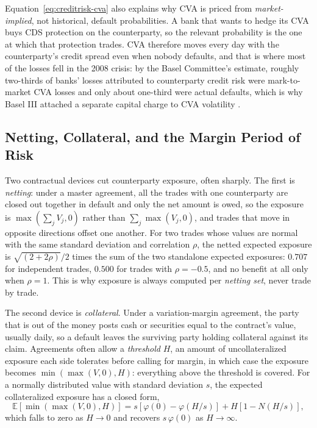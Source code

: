 \documentclass[../ai_in_finance]{subfiles}
\begin{document}
Equation~\eqref{eq:creditrisk-cva} also explains why CVA is priced from \emph{market-implied}, not historical, default probabilities. A bank that wants to hedge its CVA buys CDS protection on the counterparty, so the relevant probability is the one at which that protection trades. CVA therefore moves every day with the counterparty's credit spread even when nobody defaults, and that is where most of the losses fell in the 2008 crisis: by the Basel Committee's estimate, roughly two-thirds of banks' losses attributed to counterparty credit risk were mark-to-market CVA losses and only about one-third were actual defaults, which is why Basel III attached a separate capital charge to CVA volatility \parencite{bcbs2011ccr}.

\subsection{Netting, Collateral, and the Margin Period of Risk}
\label{sec:netting-collateral}

Two contractual devices cut counterparty exposure, often sharply. The first is \emph{netting}: under a master agreement, all the trades with one counterparty are closed out together in default and only the net amount is owed, so the exposure is $\max(\sum_j V_j, 0)$ rather than $\sum_j \max(V_j, 0)$, and trades that move in opposite directions offset one another. For two trades whose values are normal with the same standard deviation and correlation $\rho$, the netted expected exposure is $\sqrt{(2+2\rho)}/2$ times the sum of the two standalone expected exposures: $0.707$ for independent trades, $0.500$ for trades with $\rho = -0.5$, and no benefit at all only when $\rho = 1$. This is why exposure is always computed per \emph{netting set}, never trade by trade.

The second device is \emph{collateral}. Under a variation-margin agreement, the party that is out of the money posts cash or securities equal to the contract's value, usually daily, so a default leaves the surviving party holding collateral against its claim. Agreements often allow a \emph{threshold} $H$, an amount of uncollateralized exposure each side tolerates before calling for margin, in which case the exposure becomes $\min(\max(V,0), H)$: everything above the threshold is covered. For a normally distributed value with standard deviation $s$, the expected collateralized exposure has a closed form,
\begin{equation}
\label{eq:creditrisk-threshold-ee}
\mathbb{E}\!\left[\min\!\left(\max(V,0), H\right)\right] = s\left[\varphi(0) - \varphi(H/s)\right] + H\left[1 - N(H/s)\right],
\end{equation}
which falls to zero as $H \to 0$ and recovers $s\,\varphi(0)$ as $H \to \infty$.
\end{document}
